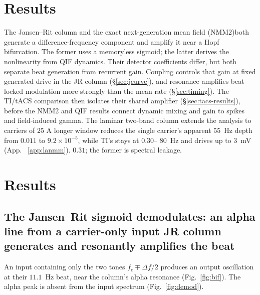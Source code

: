 \documentclass[11pt,a4paper]{article}
\providecommand{\DIFaddtex}[1]{{\protect\color{blue} \sf #1}} %
\providecommand{\DIFdeltex}[1]{{\protect\color{red} \scriptsize #1}} %
\providecommand{\DIFaddbegin}{} %
\providecommand{\DIFaddend}{} %
\providecommand{\DIFdelbegin}{} %
\providecommand{\DIFdelend}{} %
\providecommand{\DIFadd}[1]{\texorpdfstring{\DIFaddtex{#1}}{#1}} %
\providecommand{\DIFdel}[1]{\texorpdfstring{\DIFdeltex{#1}}{}} %
\begin{document}
\DIFdelbegin \section{\DIFdel{Results}}
\addtocounter{section}{-1}%
\DIFdel{The Jansen--Rit column and the exact next-generation mean field (NMM2)both generate a
difference-frequency component and amplify it near a Hopf bifurcation. The former uses
a memoryless sigmoid; the latter derives the nonlinearity from QIF dynamics. Their
detector coefficients differ, but both separate beat generation from recurrent gain. Coupling controls that gain at fixed generated drive in the JR column
(\S\ref{sec:jcurve}), and resonance amplifies beat-locked modulation more strongly than
the mean rate (\S\ref{sec:timing}). The TI/tACS comparison then isolates their
shared amplifier (\S\ref{sec:tacs-results}), before the
NMM2 and QIF results
connect dynamic mixing and gain to spikes and field-induced gamma.
The laminar
two-band column extends the analysis to carriers of $25$}\DIFdelend \DIFaddbegin \DIFadd{A longer window reduces the single carrier's apparent $55$~Hz
depth from $0.011$ to $9.2\times10^{-5}$, while TI's stays at $0.30$}\DIFaddend --\DIFdelbegin \DIFdel{$80$~Hz
and drives up to $3$~mV (App.
~\ref{app:lanmm}).
}\DIFdelend \DIFaddbegin \DIFadd{$0.31$;
the former is spectral leakage.
}\DIFaddend

\DIFaddbegin \fi

\section{\DIFadd{Results}}
\DIFaddend \subsection{The \DIFdelbegin \DIFdel{Jansen--Rit sigmoid demodulates: an alpha line from a carrier-only input}\DIFdelend \DIFaddbegin \DIFadd{JR column generates and resonantly amplifies the beat}\DIFaddend }
An input containing only the two tones $f_c\mp\Delta f/2$ produces an output
oscillation at their $11.1$~Hz beat, near the column's alpha resonance
(Fig.~\ref{fig:bif}). The alpha peak is absent from the input spectrum
(Fig.~\ref{fig:demod}).
\end{document}
